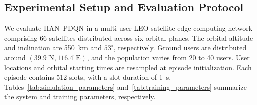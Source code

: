 \documentclass[journal]{IEEEtran}
\begin{document}
\subsection{Experimental Setup and Evaluation Protocol}
\label{subsec:experimental_setup}

We evaluate HAN--PDQN in a multi-user LEO satellite edge
computing network comprising 66 satellites distributed
across six orbital planes. The orbital altitude and
inclination are 550~km and $53^\circ$, respectively.
Ground users are distributed around
$(39.9^\circ\mathrm{N},116.4^\circ\mathrm{E})$, and the
population varies from 20 to 40 users.
User locations and orbital starting times are resampled
at episode initialization. Each episode contains
512 slots, with a slot duration of 1~s.
Tables~\ref{tab:simulation_parameters} and~\ref{tab:training_parameters}
summarize the system and training parameters, respectively.
\end{document}
